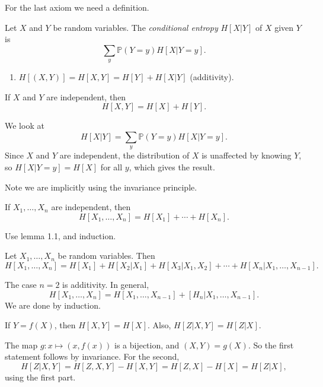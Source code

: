 \documentclass[12pt]{article}
\begin{document}
For the last axiom we need a definition.
\begin{definition}
	Let $X$ and $Y$ be random variables. The \emph{conditional entropy} $H[X|Y]$ of $X$ given $Y$ is
	\[
		\sum_y \mathbb{P}(Y = y) H[X|Y = y].
	\]
\end{definition}
\begin{enumerate}[resume*]
	\item $H[(X,Y)] = H[X,Y] = H[Y] + H[X|Y]$ (additivity).
\end{enumerate}
\begin{lemma}
	If $X$ and $Y$ are independent, then
	\[
		H[X,Y] = H[X] + H[Y].
	\]
\end{lemma}

\begin{proofbox}
	We look at
	\[
		H[X|Y] = \sum_{y} \mathbb{P}(Y = y) H[X|Y = y].
	\]
	Since $X$ and $Y$ are independent, the distribution of $X$ is unaffected by knowing $Y$, so $H[X|Y = y] = H[X]$ for all $y$, which gives the result.
\end{proofbox}
Note we are implicitly using the invariance principle.
\begin{corollary}
	If $X_1, \ldots, X_n$ are independent, then
	\[
		H[X_1, \ldots, X_n] = H[X_1] + \cdots + H[X_n].
	\]
\end{corollary}

\begin{proofbox}
	Use lemma 1.1, and induction.
\end{proofbox}

\begin{lemma}
	Let $X_1, \ldots, X_n$ be random variables. Then
	\[
		H[X_1, \ldots, X_n] = H[X_1] + H[X_2|X_1] + H[X_3|X_1,X_2] + \cdots + H[X_n|X_1,\ldots,X_{n-1}].
	\]
\end{lemma}

\begin{proofbox}
	The case $n = 2$ is additivity. In general,
	\[
		H[X_1, \ldots, X_n] = H[X_1, \ldots, X_{n-1}] + [H_n|X_1,\ldots,X_{n-1}].
	\]
	We are done by induction.
\end{proofbox}

\begin{lemma}
	If $Y = f(X)$, then $H[X, Y] = H[X]$. Also, $H[Z|X,Y] = H[Z|X]$.
\end{lemma}

\begin{proofbox}
	The map $g: x \mapsto (x, f(x))$ is a bijection, and $(X, Y) = g(X)$. So the first statement follows by invariance. For the second,
	\[
		H[Z|X,Y] = H[Z,X,Y] - H[X,Y] = H[Z,X] - H[X] = H[Z|X],
	\]
	using the first part.
\end{proofbox}
\end{document}
